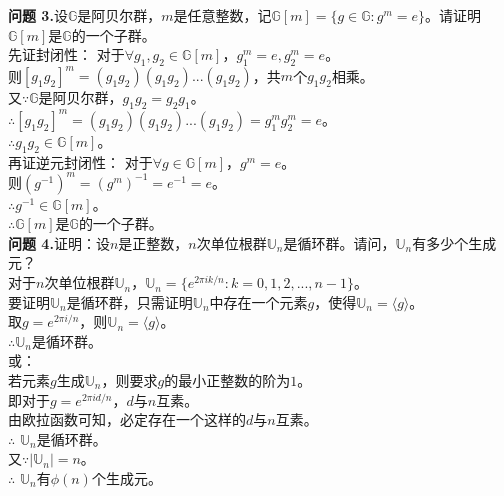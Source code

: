 \documentclass[a4paper]{CINTA}
\begin{document}
\textbf{问题 3.}设$\mathbb{G}$是阿贝尔群，$m$是任意整数，记$\mathbb{G}[m] = \{ g\in \mathbb{G}: g^m = e \}$。请证明$\mathbb{G}[m]$是$\mathbb{G}$的一个子群。\\
先证封闭性：
对于$\forall g_1,g_2 \in \mathbb{G}[m]$，$g_1^m = e, g_2^m = e$。\\
则$[g_1g_2]^m=(g_1g_2)(g_1g_2)...(g_1g_2)$，共$m$个$g_1g_2$相乘。\\
又$\because \mathbb{G}$是阿贝尔群，$g_1g_2=g_2g_1$。\\
$\therefore [g_1g_2]^m=(g_1g_2)(g_1g_2)...(g_1g_2)=g_1^mg_2^m=e$。\\
$\therefore g_1g_2 \in \mathbb{G}[m]$。\\
再证逆元封闭性：
对于$\forall g \in \mathbb{G}[m]$，$g^m = e$。\\
则$(g^{-1})^m=(g^m)^{-1}=e^{-1}=e$。\\
$\therefore g^{-1} \in \mathbb{G}[m]$。\\
$\therefore \mathbb{G}[m]$是$\mathbb{G}$的一个子群。\\

\textbf{问题 4.}证明：设$n$是正整数，$n$次单位根群$\mathbb{U}_n$是循环群。请问，$\mathbb{U}_n$有多少个生成元？\\
对于$n$次单位根群$\mathbb{U}_n$，$\mathbb{U}_n=\{e^{2\pi i k/n}: k=0,1,2,...,n-1\}$。\\
要证明$\mathbb{U}_n$是循环群，只需证明$\mathbb{U}_n$中存在一个元素$g$，使得$\mathbb{U}_n=\langle g \rangle$。\\
取$g=e^{2\pi i/n}$，则$\mathbb{U}_n=\langle g \rangle$。\\
$\therefore \mathbb{U}_n$是循环群。\\
或：\\
若元素$g$生成$\mathbb{U}_n$，则要求$g$的最小正整数的阶为$1$。\\
即对于$g=e^{2\pi i d/n}$，$d$与$n$互素。\\
由欧拉函数可知，必定存在一个这样的$d$与$n$互素。\\
$\therefore$ $\mathbb{U}_n$是循环群。\\
又$\because |\mathbb{U}_n|=n$。\\
$\therefore$ $\mathbb{U}_n$有$\phi(n)$个生成元。\\
\end{document}
